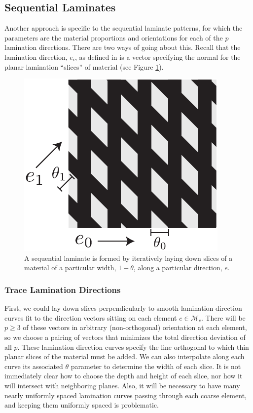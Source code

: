 \documentclass[10pt]{article}
\providecommand{\mesh}{\mathcal{M}}
\begin{document}

\subsection{Sequential Laminates}
Another approach is specific to the sequential laminate patterns, for which the
parameters are the material proportions and orientations for each of the $p$
lamination directions. There are two ways of going about this.
Recall that the lamination direction, $e_i$, as defined in
\cite{allaire2002shape} is a vector specifying the normal for the planar
lamination ``slices'' of material (see Figure \ref{fig:sequential_laminate}).
\begin{figure}[h!]
    \centering
    \includegraphics[height=.3\textwidth]{images/sequential_laminates.pdf}
    \caption{A sequential laminate is formed by iteratively laying down slices
        of a material of a particular width, $1 - \theta$, along a particular
    direction, $e$.}
    \label{fig:sequential_laminate}
\end{figure}

\subsubsection{Trace Lamination Directions}
\label{sec:direction_trace}
First, we could lay down slices perpendicularly to smooth lamination direction
curves fit to the direction vectors sitting on each element $e \in \mesh_c$.
There will be $p \ge 3$ of these vectors in arbitrary (non-orthogonal)
orientation at each element, so we choose a pairing of vectors that minimizes
the total direction deviation of all $p$. These lamination direction curves
specify the line orthogonal to which thin planar slices of the material must be
added. We can also interpolate along each curve its associated $\theta$
parameter to determine the width of each slice. It is not immediately clear how
to choose the depth and height of each slice, nor how it will intersect with
neighboring planes. Also, it will be necessary to have many nearly uniformly
spaced lamination curves passing through each coarse element, and keeping them
uniformly spaced is problematic.
\end{document}

